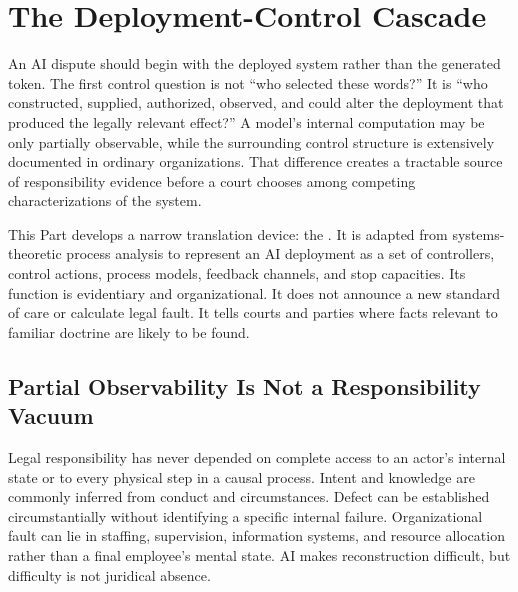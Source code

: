 \section{The Deployment-Control Cascade}
\label{sec:control}

An AI dispute should begin with the deployed system rather than the generated token. The first control question is not ``who selected these words?'' It is ``who constructed, supplied, authorized, observed, and could alter the deployment that produced the legally relevant effect?'' A model's internal computation may be only partially observable, while the surrounding control structure is extensively documented in ordinary organizations. That difference creates a tractable source of responsibility evidence before a court chooses among competing characterizations of the system.

This Part develops a narrow translation device: the \Cascade. It is adapted from systems-theoretic process analysis to represent an AI deployment as a set of controllers, control actions, process models, feedback channels, and stop capacities. Its function is evidentiary and organizational. It does not announce a new standard of care or calculate legal fault. It tells courts and parties where facts relevant to familiar doctrine are likely to be found.

\subsection{Partial Observability Is Not a Responsibility Vacuum}

Legal responsibility has never depended on complete access to an actor's internal state or to every physical step in a causal process. Intent and knowledge are commonly inferred from conduct and circumstances. Defect can be established circumstantially without identifying a specific internal failure. Organizational fault can lie in staffing, supervision, information systems, and resource allocation rather than a final employee's mental state. AI makes reconstruction difficult, but difficulty is not juridical absence.

